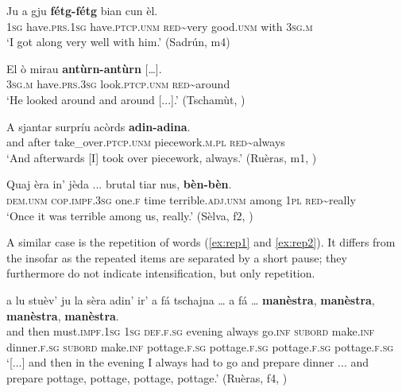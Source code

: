 \ea
\label{ex:redadv1}
\gll  Ju a gju \textbf{fétg-fétg} bian cun èl. \\
\textsc{1sg} have.\textsc{prs.1sg} have.\textsc{ptcp.unm} \textsc{red}\textasciitilde{very} good.\textsc{unm} with \textsc{3sg.m}\\
\glt `I got along very well with him.' (Sadrún, m4)
\z

\ea
\label{ex:redadv2}
\gll El ò mirau \textbf{antùrn-antùrn} […].\\
\textsc{3sg.m} have.\textsc{prs.3sg} look.\textsc{ptcp.unm} \textsc{red}\textasciitilde{around} \\
\glt `He looked around and around [...].' (Tschamùt, \citealt[18]{Büchli1966})
\z

\ea
\label{ex:redadv3}
\gll    A sjantar surpríu acòrds \textbf{adin-adina}.\\
and after take\_over.\textsc{ptcp.unm} piecework.\textsc{m.pl} \textsc{red}\textasciitilde{always} \\
\glt `And afterwards [I] took over piecework, always.' (Ruèras, m1, )
\z

\ea
\label{ex:redadv4}
\gll Quaj èra in’ jèda ... brutal tiar nus, \textbf{bèn-bèn}.   \\
\textsc{dem.unm} \textsc{cop.impf.3sg} one.\textsc{f} time {} terrible.\textsc{adj.unm} among \textsc{1pl} \textsc{red}\textasciitilde{really}\\
\glt `Once it was terrible among us, really.' (Sèlva, f2, )
\z

A similar case is the repetition of words (\ref{ex:rep1} and \ref{ex:rep2}). It differs from the  insofar as the repeated items are separated by a short pause; they furthermore do not indicate intensification, but only repetition.

\ea
\label{ex:rep1}
\gll [...] a lu stuèv’ ju la sèra adin’ ir' a fá tschajna … a fá … \textbf{manèstra}, \textbf{manèstra}, \textbf{manèstra}, \textbf{manèstra}.\\
{} and then must.\textsc{impf.1sg} \textsc{1sg} \textsc{def.f.sg} evening always go.\textsc{inf} \textsc{subord} make.\textsc{inf} dinner.\textsc{f.sg} {} \textsc{subord} make.\textsc{inf} {}  pottage.\textsc{f.sg} pottage.\textsc{f.sg} pottage.\textsc{f.sg} pottage.\textsc{f.sg}\\
\glt `[...] and then in the evening I always had to go and prepare dinner ... and prepare pottage, pottage, pottage, pottage.' (Ruèras, f4, )
\z
 
